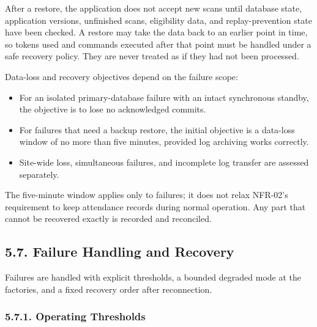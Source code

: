 After a restore, the application does not accept new scans until database state, application versions, unfinished scans, eligibility data, and replay-prevention state have been checked. A restore may take the data back to an earlier point in time, so tokens used and commands executed after that point must be handled under a safe recovery policy. They are never treated as if they had not been processed.


Data-loss and recovery objectives depend on the failure scope:


\begin{itemize}[leftmargin=36pt, itemsep=2pt, topsep=4pt, parsep=2pt]

  \item For an isolated primary-database failure with an intact synchronous standby, the objective is to lose no acknowledged commits.

  \item For failures that need a backup restore, the initial objective is a data-loss window of no more than five minutes, provided log archiving works correctly.

  \item Site-wide loss, simultaneous failures, and incomplete log transfer are assessed separately.

\end{itemize}

The five-minute window applies only to failures; it does not relax NFR-02's requirement to keep attendance records during normal operation. Any part that cannot be recovered exactly is recorded and reconciled.

\subsection*{5.7. Failure Handling and Recovery}

{}

Failures are handled with explicit thresholds, a bounded degraded mode at the factories, and a fixed recovery order after reconnection.

\subsubsection*{5.7.1. Operating Thresholds}

{}


